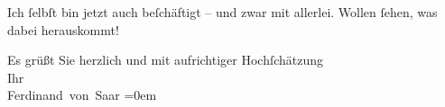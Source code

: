 \pstart
           Ich{ }ſelbſt bin jetzt auch beſchäftigt – und zwar mit allerlei. Wollen{ }ſehen, was
               dabei herauskommt!\pend
           
\pstart
           Es grüßt Sie herzlich und mit aufrichtiger Hochſchätzung{\\[\baselineskip]}Ihr{\\[\baselineskip]}\spacefill\mbox{Ferdinand von Saar}\pend
           \leftskip=0em{}\endnumbering{}  \newcommand{\dateiname}{L00410}\newcommand{\titel}{Ferdinand von Saar an Arthur Schnitzler, 13. 12. 1894}\newcommand{\editorInnen}{Martin Anton Müller und Gerd-Hermann Susen}
